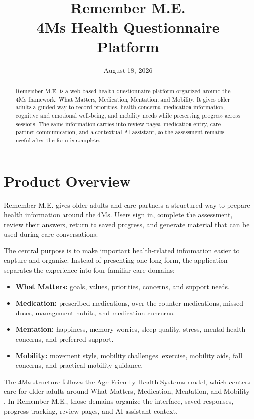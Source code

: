 \documentclass[11pt]{article}
\title{\textbf{Remember M.E.}\\
\large 4Ms Health Questionnaire Platform}
\author{}
\date{August 18, 2026}
\begin{document}
\maketitle

\begin{abstract}
Remember M.E. is a web-based health questionnaire platform organized around the 4Ms framework: What Matters, Medication, Mentation, and Mobility. It gives older adults a guided way to record priorities, health concerns, medication information, cognitive and emotional well-being, and mobility needs while preserving progress across sessions. The same information carries into review pages, medication entry, care partner communication, and a contextual AI assistant, so the assessment remains useful after the form is complete.
\end{abstract}

\section{Product Overview}

Remember M.E. gives older adults and care partners a structured way to prepare health information around the 4Ms. Users sign in, complete the assessment, review their answers, return to saved progress, and generate material that can be used during care conversations.

The central purpose is to make important health-related information easier to capture and organize. Instead of presenting one long form, the application separates the experience into four familiar care domains:

\begin{itemize}
  \item \textbf{What Matters:} goals, values, priorities, concerns, and support needs.
  \item \textbf{Medication:} prescribed medications, over-the-counter medications, missed doses, management habits, and medication concerns.
  \item \textbf{Mentation:} happiness, memory worries, sleep quality, stress, mental health concerns, and preferred support.
  \item \textbf{Mobility:} movement style, mobility challenges, exercise, mobility aids, fall concerns, and practical mobility guidance.
\end{itemize}

The 4Ms structure follows the Age-Friendly Health Systems model, which centers care for older adults around What Matters, Medication, Mentation, and Mobility \cite{ihi-age-friendly}. In Remember M.E., those domains organize the interface, saved responses, progress tracking, review pages, and AI assistant context.
\end{document}
